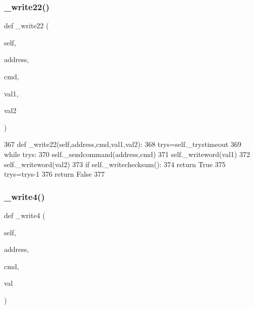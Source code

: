 \subsubsection{\texorpdfstring{\+\_\+write22()}{\_write22()}}
{\footnotesize\ttfamily def \+\_\+write22 (\begin{DoxyParamCaption}\item[{}]{self,  }\item[{}]{address,  }\item[{}]{cmd,  }\item[{}]{val1,  }\item[{}]{val2 }\end{DoxyParamCaption})\hspace{0.3cm}{\ttfamily [private]}}


\begin{DoxyCode}
367     \textcolor{keyword}{def }\_write22(self,address,cmd,val1,val2):
368         trys=self.\_trystimeout
369         \textcolor{keywordflow}{while} trys:
370             self.\_sendcommand(address,cmd)
371             self.\_writeword(val1)
372             self.\_writeword(val2)
373             \textcolor{keywordflow}{if} self.\_writechecksum():
374                 \textcolor{keywordflow}{return} \textcolor{keyword}{True}
375             trys=trys-1
376         \textcolor{keywordflow}{return} \textcolor{keyword}{False}
377 
\end{DoxyCode}
\mbox{\label{classtoxic__hardware_1_1roboclaw__3_1_1Roboclaw_ab234c49f09cd0b5634795fcf665336ac}} 
\subsubsection{\texorpdfstring{\+\_\+write4()}{\_write4()}}
{\footnotesize\ttfamily def \+\_\+write4 (\begin{DoxyParamCaption}\item[{}]{self,  }\item[{}]{address,  }\item[{}]{cmd,  }\item[{}]{val }\end{DoxyParamCaption})\hspace{0.3cm}{\ttfamily [private]}}


